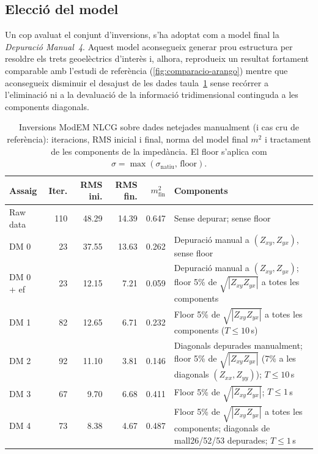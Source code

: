 \documentclass[11pt,a4paper,oneside]{article}
\begin{document}
\subsection{Elecció del model}


Un cop avaluat el conjunt d'inversions, s'ha adoptat com a model final la
\emph{Depuració Manual~4}. Aquest
model aconsegueix generar prou estructura per resoldre els trets geoelèctrics
d'interès i, alhora, reprodueix un resultat fortament comparable amb l'estudi de
referència \citet{arango2005} (\cref{fig:comparacio-arango}) mentre que aconsegueix disminuir el desajust de les dades taula~\ref{tab:modem_manual} sense recórrer a l'eliminació ni a la devaluació de la informació
tridimensional continguda a les components diagonals.

\vspace{1pt}

\begin{table}[H]
  \centering
  \scriptsize
  \captionsetup{font=scriptsize,skip=3pt}
  \setlength{\tabcolsep}{2.5pt}
  \renewcommand{\arraystretch}{0.92}
  \begin{tabularx}{\textwidth}{@{}lrrrr>{\raggedright\arraybackslash}X@{}}
    \toprule
    \textbf{Assaig} & \textbf{Iter.} & \textbf{RMS ini.} & \textbf{RMS fin.} &
    \textbf{$m^2_{\mathrm{fin}}$} & \textbf{Components} \\
    \midrule
    Raw data & 110 & 48.29 & 14.39 & 0.647
      & Sense depurar; sense floor \\
    \midrule
    DM 0 & 23 & 37.55 & 13.63 & 0.262
      & Depuració manual a $(Z_{xy},Z_{yx})$,  sense floor \\
    \midrule
    DM 0 + ef & 23 & 12.15 & 7.21 & 0.059
      & Depuració manual a $(Z_{xy},Z_{yx})$; floor 5\% de $\sqrt{|Z_{xy}Z_{yx}|}$ a totes les components \\
    \midrule
    DM 1 & 82 & 12.65 & 6.71 & 0.232
      & Floor 5\% de $\sqrt{|Z_{xy}Z_{yx}|}$ a totes les components ($T\le10$\,s) \\
    \midrule
    DM 2 & 92 & 11.10 & 3.81 & 0.146
      & Diagonals depurades manualment; floor 5\% de $\sqrt{|Z_{xy}Z_{yx}|}$ (7\% a les diagonals $(Z_{xx},Z_{yy})$); $T\le10$\,s \\
    \midrule
    DM 3 & 67 & 9.70 & 6.68 & 0.411
      & Floor 5\% de $\sqrt{|Z_{xy}Z_{yx}|}$; $T\le1$\,s \\
    \midrule
    DM 4 & 73 & 8.38 & 4.67 & 0.487
      & Floor 5\% de $\sqrt{|Z_{xy}Z_{yx}|}$ a totes les components; diagonals de mall26/52/53 depurades; $T\le1$\,s \\
    \bottomrule
  \end{tabularx}
  \caption{Inversions ModEM NLCG sobre dades netejades manualment (i cas cru de
    referència): iteracions, RMS inicial i final, norma del model final $m^2$ i
    tractament de les components de la impedància. El floor s'aplica com
    $\sigma=\max(\sigma_{\mathrm{natiu}},\,\mathrm{floor})$.}
  \label{tab:modem_manual}
\end{table}
\end{document}
